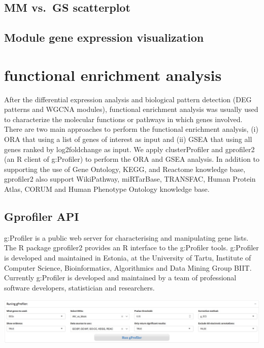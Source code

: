 \documentclass[
  a4paper,
  oneside]{book}
\begin{document}
\hypertarget{mm-vs.-gs-scatterplot}{%
\section{MM vs.~GS scatterplot}\label{mm-vs.-gs-scatterplot}}

\hypertarget{module-gene-expression-visualization}{%
\section{Module gene expression visualization}\label{module-gene-expression-visualization}}

\hypertarget{functional-enrichment-analysis}{%
\chapter{functional enrichment analysis}\label{functional-enrichment-analysis}}

After the differential expression analysis and biological pattern detection (DEG patterns and WGCNA modules), functional enrichment analysis was usually used to characterize the molecular functions or pathways in which genes involved. There are two main approaches to perform the functional enrichment analysis, (i) ORA that using a list of genes of interest as input and (ii) GSEA that using all genes ranked by log2foldchange as input. We apply clusterProfiler and gprofiler2 (an R client of g:Profiler) to perform the ORA and GSEA analysis. In addition to supporting the use of Gene Ontology, KEGG, and Reactome knowledge base, gprofiler2 also support WikiPathway, miRTarBase, TRANSFAC, Human Protein Atlas, CORUM and Human Phenotype Ontology knowledge base.

\hypertarget{gprofiler-api}{%
\section{Gprofiler API}\label{gprofiler-api}}

g:Profiler is a public web server for characterising and manipulating gene lists. The R package gprofiler2 provides an R interface to the g:Profiler tools. g:Profiler is developed and maintained in Estonia, at the University of Tartu, Institute of Computer Science, Bioinformatics, Algorithmics and Data Mining Group BIIT. Currently g:Profiler is developed and maintained by a team of professional software developers, statistician and researchers.

\includegraphics{images/fucntion-grofiler.jpeg}
\end{document}
